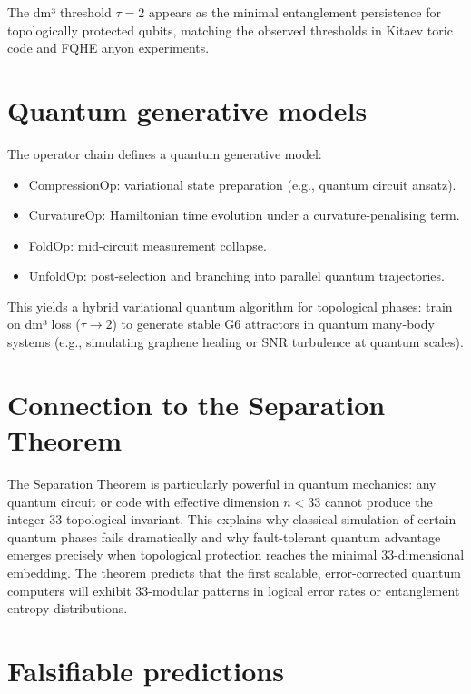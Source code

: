 \documentclass[19pt]{book}
\theoremstyle{plain}
\theoremstyle{definition}
\theoremstyle{remark}
\begin{document}
The dm³ threshold \(\tau = 2\) appears as the minimal entanglement persistence for topologically protected qubits, matching the observed thresholds in Kitaev toric code and FQHE anyon experiments.

\section{Quantum generative models}

The operator chain defines a quantum generative model:
\begin{itemize}
\item CompressionOp: variational state preparation (e.g., quantum circuit ansatz).
\item CurvatureOp: Hamiltonian time evolution under a curvature-penalising term.
\item FoldOp: mid-circuit measurement collapse.
\item UnfoldOp: post-selection and branching into parallel quantum trajectories.
\end{itemize}

This yields a hybrid variational quantum algorithm for topological phases: train on dm³ loss (\(\tau \to 2\)) to generate stable G6 attractors in quantum many-body systems (e.g., simulating graphene healing or SNR turbulence at quantum scales).

\section{Connection to the Separation Theorem}

The Separation Theorem is particularly powerful in quantum mechanics: any quantum circuit or code with effective dimension \(n < 33\) cannot produce the integer 33 topological invariant. This explains why classical simulation of certain quantum phases fails dramatically and why fault-tolerant quantum advantage emerges precisely when topological protection reaches the minimal 33-dimensional embedding. The theorem predicts that the first scalable, error-corrected quantum computers will exhibit 33-modular patterns in logical error rates or entanglement entropy distributions.

\section{Falsifiable predictions}
\end{document}
